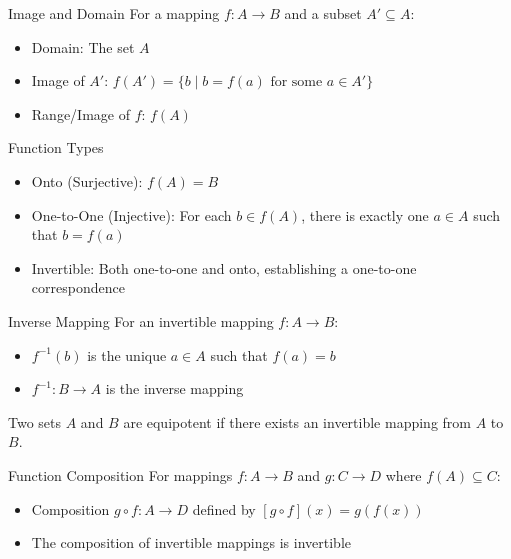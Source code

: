\begin{definitionbox}{Image and Domain}
For a mapping $f: A \to B$ and a subset $A' \subseteq A$:
\begin{itemize}
    \item Domain: The set $A$
    \item Image of $A'$: $f(A') = \{b \mid b = f(a) \text{ for some } a \in A'\}$
    \item Range/Image of $f$: $f(A)$
\end{itemize}
\end{definitionbox}

\begin{definitionbox}{Function Types}
\begin{itemize}
    \item Onto (Surjective): $f(A) = B$
    \item One-to-One (Injective): For each $b \in f(A)$, there is exactly one $a \in A$ such that $b = f(a)$
    \item Invertible: Both one-to-one and onto, establishing a one-to-one correspondence
\end{itemize}
\end{definitionbox}

\begin{definitionbox}{Inverse Mapping}
For an invertible mapping $f: A \to B$:
\begin{itemize}
    \item $f^{-1}(b)$ is the unique $a \in A$ such that $f(a) = b$
    \item $f^{-1}: B \to A$ is the inverse mapping
\end{itemize}

Two sets $A$ and $B$ are equipotent if there exists an invertible mapping from $A$ to $B$.
\end{definitionbox}

\begin{definitionbox}{Function Composition}
For mappings $f: A \to B$ and $g: C \to D$ where $f(A) \subseteq C$:
\begin{itemize}
    \item Composition $g \circ f: A \to D$ defined by $[g \circ f](x) = g(f(x))$
    \item The composition of invertible mappings is invertible
\end{itemize}
\end{definitionbox}

